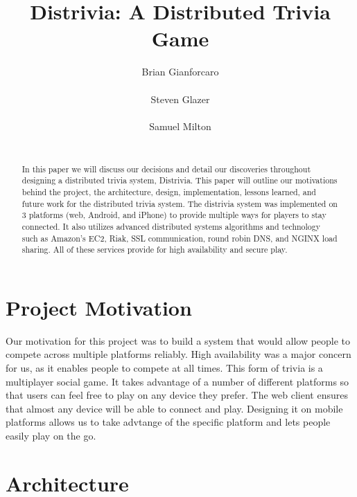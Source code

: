 \documentclass{dependencies/acm_proc_article-sp}
\begin{document}
\title{ Distrivia: A Distributed Trivia Game }
\author{
\alignauthor
Brian Gianforcaro \\
       \\
\alignauthor
Steven Glazer \\
       \\
\alignauthor
Samuel Milton \\
       \\
}
\maketitle

\begin{abstract}
In this paper we will discuss our decisions and detail our discoveries throughout designing a distributed trivia system, Distrivia. 
This paper will outline our motivations behind the project, the architecture, design, implementation, lessons learned, and future work for the distributed trivia system. 
The distrivia system was implemented on 3 platforms (web, Android, and iPhone) to provide multiple ways for players to stay connected. 
It also utilizes advanced distributed systems algorithms and technology such as Amazon's EC2, Riak, SSL communication, round robin DNS, and NGINX load sharing. 
All of these services provide for high availability and secure play.
\end{abstract}

\section{Project Motivation}
Our motivation for this project was to build a system that would allow people to compete across multiple platforms reliably.
High availability was a major concern for us, as it enables people to compete at all times.
This form of trivia is a multiplayer social game.
It takes advantage of a number of different platforms so that users can feel free to play on any device they prefer.
The web client ensures that almost any device will be able to connect and play.
Designing it on mobile platforms allows us to take advtange of the specific platform and lets people easily play on the go.

\section{Architecture}
\end{document}
